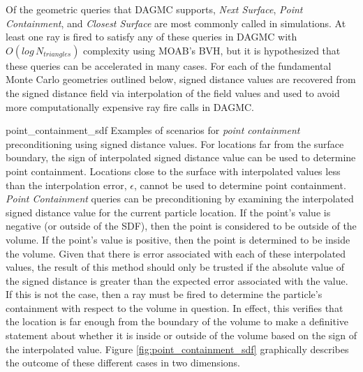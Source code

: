 Of the geometric queries that DAGMC supports, \textit{Next Surface},
\textit{Point Containment}, and \textit{Closest Surface} are most commonly
called in simulations.  At least one ray is fired to satisfy any of these
queries in DAGMC with $O(log \, N_{triangles})$ complexity using MOAB's BVH, but it is
hypothesized that these queries can be accelerated in many cases. For each of
the fundamental Monte Carlo geometries outlined below, signed distance values
are recovered from the signed distance field via interpolation of the field
values and used to avoid more computationally expensive ray fire calls in DAGMC.


              {point_containment_sdf}
              {Examples of scenarios for \textit{point containment} preconditioning using
                signed distance values. For locations far from the surface
                boundary, the sign of interpolated signed distance value can be
                used to determine point containment. Locations close to the
                surface with interpolated values less than the interpolation
                error, $\epsilon$, cannot be used to determine point
                containment. }
              {
                \textit{Point Containment} queries can be preconditioning by
                examining the interpolated signed distance value for the current
                particle location. If the point's value is negative (or outside
                of the SDF), then the point is considered to be outside of the
                volume. If the point's value is positive, then the point is
                determined to be inside the volume. Given that there is error
                associated with each of these interpolated values, the result of
                this method should only be trusted if the absolute value of the
                signed distance is greater than the expected error associated
                with the value. If this is not the case, then a ray must be
                fired to determine the particle's containment with respect to
                the volume in question. In effect, this verifies that the
                location is far enough from the boundary of the volume to make a
                definitive statement about whether it is inside or outside of
                the volume based on the sign of the interpolated value.  Figure
                \ref{fig:point_containment_sdf} graphically describes the
                outcome of these different cases in two dimensions.
              }

